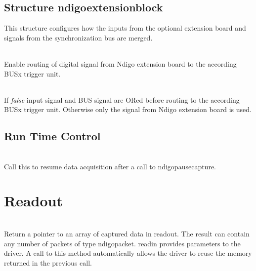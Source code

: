 		\subsection{Structure ndigo\tu extension\tu block}
			This structure configures how the inputs from the optional extension board and signals from the synchronization bus are merged.\par

			\\
			Enable routing of digital signal from Ndigo extension board to the according BUSx trigger unit.\par

			\\
			If \textit{false} input signal and BUS signal are ORed before routing to the according BUSx trigger unit. Otherwise only the signal from Ndigo extension board is used.
			
		\subsection{Run Time Control}
		
			\par
		
			\par

			\\
			Call this to resume data acquisition after a call to \textsf{ndigo\tu pause\tu capture}.\par

		
	\section{Readout\label{cp:readout}}
	
		  \\
		Return a pointer to an array of captured data in \textsf{read\tu out}. The result can contain any number of packets of type \textsf{ndigo\tu packet}. \textsf{read\tu in} provides parameters to the driver. A call to this method automatically allows the driver to reuse the memory returned in the previous call.\par

